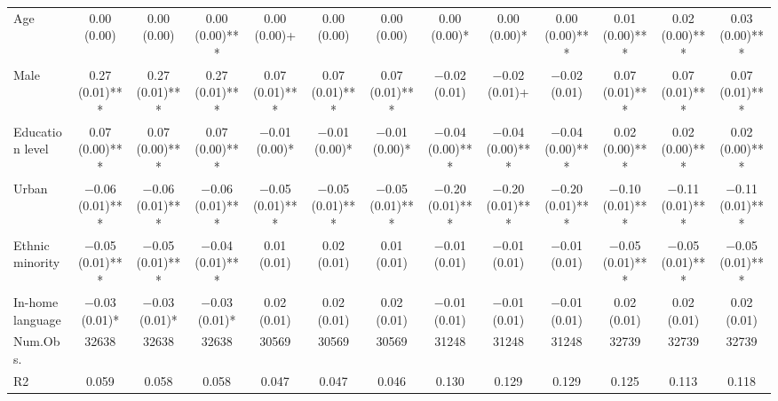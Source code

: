 \begin{table}[H]
\begin{tabular}[t]{lcccccccccccc}
Age & \num{0.00} (\num{0.00}) & \num{0.00} (\num{0.00}) & \num{0.00} (\num{0.00})*** & \num{0.00} (\num{0.00})+ & \num{0.00} (\num{0.00}) & \num{0.00} (\num{0.00}) & \num{0.00} (\num{0.00})* & \num{0.00} (\num{0.00})* & \num{0.00} (\num{0.00})*** & \num{0.01} (\num{0.00})*** & \num{0.02} (\num{0.00})*** & \num{0.03} (\num{0.00})***\\
Male & \num{0.27} (\num{0.01})*** & \num{0.27} (\num{0.01})*** & \num{0.27} (\num{0.01})*** & \num{0.07} (\num{0.01})*** & \num{0.07} (\num{0.01})*** & \num{0.07} (\num{0.01})*** & \num{-0.02} (\num{0.01}) & \num{-0.02} (\num{0.01})+ & \num{-0.02} (\num{0.01}) & \num{0.07} (\num{0.01})*** & \num{0.07} (\num{0.01})*** & \num{0.07} (\num{0.01})***\\
Education level & \num{0.07} (\num{0.00})*** & \num{0.07} (\num{0.00})*** & \num{0.07} (\num{0.00})*** & \num{-0.01} (\num{0.00})* & \num{-0.01} (\num{0.00})* & \num{-0.01} (\num{0.00})* & \num{-0.04} (\num{0.00})*** & \num{-0.04} (\num{0.00})*** & \num{-0.04} (\num{0.00})*** & \num{0.02} (\num{0.00})*** & \num{0.02} (\num{0.00})*** & \num{0.02} (\num{0.00})***\\
Urban & \num{-0.06} (\num{0.01})*** & \num{-0.06} (\num{0.01})*** & \num{-0.06} (\num{0.01})*** & \num{-0.05} (\num{0.01})*** & \num{-0.05} (\num{0.01})*** & \num{-0.05} (\num{0.01})*** & \num{-0.20} (\num{0.01})*** & \num{-0.20} (\num{0.01})*** & \num{-0.20} (\num{0.01})*** & \num{-0.10} (\num{0.01})*** & \num{-0.11} (\num{0.01})*** & \num{-0.11} (\num{0.01})***\\
Ethnic minority & \num{-0.05} (\num{0.01})*** & \num{-0.05} (\num{0.01})*** & \num{-0.04} (\num{0.01})*** & \num{0.01} (\num{0.01}) & \num{0.02} (\num{0.01}) & \num{0.01} (\num{0.01}) & \num{-0.01} (\num{0.01}) & \num{-0.01} (\num{0.01}) & \num{-0.01} (\num{0.01}) & \num{-0.05} (\num{0.01})*** & \num{-0.05} (\num{0.01})*** & \num{-0.05} (\num{0.01})***\\
In-home language & \num{-0.03} (\num{0.01})* & \num{-0.03} (\num{0.01})* & \num{-0.03} (\num{0.01})* & \num{0.02} (\num{0.01}) & \num{0.02} (\num{0.01}) & \num{0.02} (\num{0.01}) & \num{-0.01} (\num{0.01}) & \num{-0.01} (\num{0.01}) & \num{-0.01} (\num{0.01}) & \num{0.02} (\num{0.01}) & \num{0.02} (\num{0.01}) & \num{0.02} (\num{0.01})\\
\midrule
Num.Obs. & \num{32638} & \num{32638} & \num{32638} & \num{30569} & \num{30569} & \num{30569} & \num{31248} & \num{31248} & \num{31248} & \num{32739} & \num{32739} & \num{32739}\\
R2 & \num{0.059} & \num{0.058} & \num{0.058} & \num{0.047} & \num{0.047} & \num{0.046} & \num{0.130} & \num{0.129} & \num{0.129} & \num{0.125} & \num{0.113} & \num{0.118}\\

\end{tabular}
\end{table}
